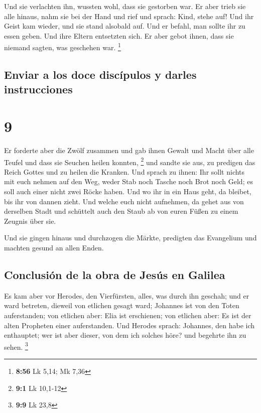  Und sie verlachten ihn, wussten wohl, dass sie gestorben
war.  Er aber trieb sie alle hinaus, nahm sie bei der
Hand und rief und sprach: Kind, stehe auf!  Und ihr Geist
kam wieder, und sie stand alsobald auf. Und er befahl, man sollte ihr zu
essen geben.  Und ihre Eltern entsetzten sich. Er aber
gebot ihnen, dass sie niemand sagten, was geschehen war. \footnote{\textbf{8:56}
  Lk 5,14; Mk 7,36}

\hypertarget{enviar-a-los-doce-discuxedpulos-y-darles-instrucciones}{%
\subsection{Enviar a los doce discípulos y darles
instrucciones}\label{enviar-a-los-doce-discuxedpulos-y-darles-instrucciones}}

\hypertarget{section-8}{%
\section{9}\label{section-8}}

 Er forderte aber die Zwölf zusammen und gab ihnen Gewalt
und Macht über alle Teufel und dass sie Seuchen heilen konnten,
\footnote{\textbf{9:1} Lk 10,1-12}  und sandte sie aus, zu
predigen das Reich Gottes und zu heilen die Kranken.  Und
sprach zu ihnen: Ihr sollt nichts mit euch nehmen auf den Weg, weder
Stab noch Tasche noch Brot noch Geld; es soll auch einer nicht zwei
Röcke haben.  Und wo ihr in ein Haus geht, da bleibet, bis
ihr von dannen zieht.  Und welche euch nicht aufnehmen, da
gehet aus von derselben Stadt und schüttelt auch den Staub ab von euren
Füßen zu einem Zeugnis über sie.

 Und sie gingen hinaus und durchzogen die Märkte,
predigten das Evangelium und machten gesund an allen Enden.

\hypertarget{conclusiuxf3n-de-la-obra-de-jesuxfas-en-galilea}{%
\subsection{Conclusión de la obra de Jesús en
Galilea}\label{conclusiuxf3n-de-la-obra-de-jesuxfas-en-galilea}}

 Es kam aber vor Herodes, den Vierfürsten, alles, was
durch ihn geschah; und er ward betreten, dieweil von etlichen gesagt
ward; Johannes ist von den Toten auferstanden;  von
etlichen aber: Elia ist erschienen; von etlichen aber: Es ist der alten
Propheten einer auferstanden.  Und Herodes sprach:
Johannes, den habe ich enthauptet; wer ist aber dieser, von dem ich
solches höre? und begehrte ihn zu sehen. \footnote{\textbf{9:9} Lk 23,8}

